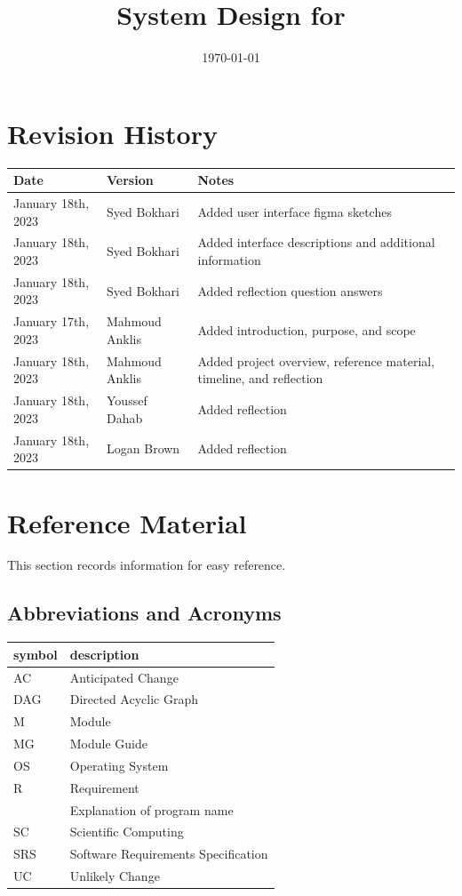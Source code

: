 \documentclass[12pt, titlepage]{article}
\begin{document}
\title{System Design for \progname{}} 
\author{\authname}
\date{\today}

\maketitle


\section{Revision History}

\begin{tabularx}{\textwidth}{p{3cm}p{2cm}X}
	\toprule {\bf Date} & {\bf Version} & {\bf Notes}\\
	\midrule
	January 18th, 2023 & Syed Bokhari & Added user interface figma sketches\\
	January 18th, 2023 & Syed Bokhari & Added interface descriptions and additional information\\
	January 18th, 2023 & Syed Bokhari & Added reflection question answers\\
	January 17th, 2023 & Mahmoud Anklis & Added introduction, purpose, and scope\\
	January 18th, 2023 & Mahmoud Anklis & Added project overview, reference material, timeline, and reflection\\
	January 18th, 2023 & Youssef Dahab & Added reflection\\
  January 18th, 2023 & Logan Brown & Added reflection\\
	\bottomrule
\end{tabularx}

\newpage

\section{Reference Material}

This section records information for easy reference.

\subsection{Abbreviations and Acronyms}

\renewcommand{\arraystretch}{1.2}
\begin{tabular}{l l} 
	\toprule		
	\textbf{symbol} & \textbf{description}\\
	\midrule 
	AC & Anticipated Change\\
	DAG & Directed Acyclic Graph \\
	M & Module \\
	MG & Module Guide \\
	OS & Operating System \\
	R & Requirement\\
	\progname & Explanation of program name\\
	SC & Scientific Computing \\
	SRS & Software Requirements Specification\\
	UC & Unlikely Change \\
	\bottomrule
\end{tabular}\\
\end{document}
